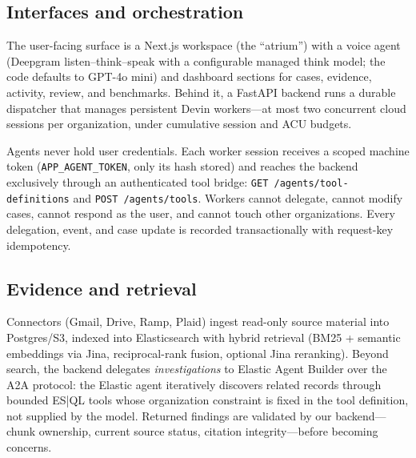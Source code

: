 \documentclass[11pt]{article}
\begin{document}
\subsection{Interfaces and orchestration}

The user-facing surface is a Next.js workspace (the ``atrium'') with a voice agent (Deepgram listen--think--speak with a configurable managed think model; the code defaults to GPT-4o mini) and dashboard sections for cases, evidence, activity, review, and benchmarks. Behind it, a FastAPI backend runs a durable dispatcher that manages persistent Devin workers---at most two concurrent cloud sessions per organization, under cumulative session and ACU budgets.

Agents never hold user credentials. Each worker session receives a scoped machine token (\texttt{APP\_AGENT\_TOKEN}, only its hash stored) and reaches the backend exclusively through an authenticated tool bridge: \texttt{GET /agents/tool-definitions} and \texttt{POST /agents/tools}. Workers cannot delegate, cannot modify cases, cannot respond as the user, and cannot touch other organizations. Every delegation, event, and case update is recorded transactionally with request-key idempotency.

\subsection{Evidence and retrieval}

Connectors (Gmail, Drive, Ramp, Plaid) ingest read-only source material into Postgres/S3, indexed into Elasticsearch with hybrid retrieval (BM25 + semantic embeddings via Jina, reciprocal-rank fusion, optional Jina reranking). Beyond search, the backend delegates \emph{investigations} to Elastic Agent Builder over the A2A protocol: the Elastic agent iteratively discovers related records through bounded ES|QL tools whose organization constraint is fixed in the tool definition, not supplied by the model. Returned findings are validated by our backend---chunk ownership, current source status, citation integrity---before becoming concerns.
\end{document}

